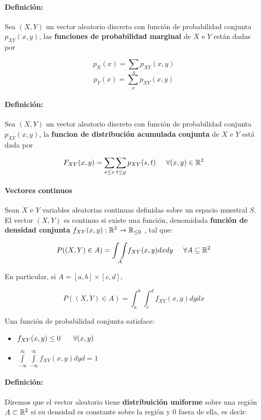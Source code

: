 \paragraph{Definición:} Sea $(X,Y)$ un vector aleatorio discreto con función de probabilidad conjunta $p_{XY}(x,y)$, las \textbf{funciones de probabilidad marginal} de $X$ e $Y$ están dadas por

	$$p_X(x) = \sum_y p_{XY}(x,y)$$
	$$p_Y(x) = \sum_x p_{XY}(x,y)$$

\paragraph{Definición:} Sea $(X,Y)$ un vector aleatorio discreto con función de probabilidad conjunta $p_{XY}(x,y)$, la \textbf{funcion de distribución acumulada conjunta} de $X$ e $Y$ está dada por

$$F_{XY}(x,y) = \sum_{s\leq x}\sum_{t\leq y} p_{XY}(s,t)\hspace*{5mm}\forall(x,y)\in\mathbb{R}^2$$

\paragraph{Vectores continuos}
Sean $X$ e $Y$ variables aleatorias continuas definidas sobre un espacio muestral $S$. El vector  $(X,Y)$ es continuo si existe una función, denomidada \textbf{función de densidad conjunta} $f_{XY}(x,y):\mathbb{R}^2\to\mathbb{R}_{\leq 0}$ , tal que:

$$P((X,Y)\in A) = \underset{A}{\int\int} f_{XY}(x,y)dxdy\hspace*{5mm}\forall A\subseteq\mathbb{R}^2$$

En particular, si $A = [a,b]\times[c,d]$,

$$P((X,Y)\in A) = \int_a^b\int_c^d f_{XY}(x,y)dydx$$

Una función de probabilidad conjunta satisface:

\begin{itemize}
	\item $f_{XY}(x,y) \leq 0~\hspace*{5mm} \forall(x,y)$
	\item $\int\limits_{-\infty}^{\infty}\int\limits_{-\infty}^{\infty} f_{XY}(x,y)dyd = 1$
\end{itemize}

\paragraph{Definición:} Diremos que el vector aleatorio tiene \textbf{distribuición uniforme} sobre una región $A\subset\mathbb{R}^2$ si su densidad es constante sobre la región y $0$ fuera de ella, es decir:

